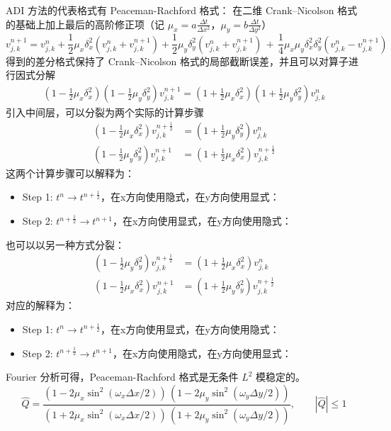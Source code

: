 ADI 方法的代表格式有 Peaceman-Rachford 格式：
在二维 Crank–Nicolson 格式的基础上加上最后的高阶修正项（记 $\mu_x =  a \frac{\Delta t}{\Delta x^2}$，$\mu_y =  b \frac{\Delta t}{\Delta y^2}$）
\[
    v_{j,k}^{n+1} = v_{j,k}^n
    + \frac12 \mu_x \delta_x^2(v_{j,k}^n + v_{j,k}^{n+1})
    + \frac12 \mu_y \delta_y^2(v_{j,k}^n + v_{j,k}^{n+1})
    \,+\, \frac14 \mu_x \mu_y \delta_x^2 \delta_y^2(v_{j,k}^n - v_{j,k}^{n+1})
\]
得到的差分格式保持了 Crank–Nicolson 格式的局部截断误差，并且可以对算子进行因式分解
\begin{align*}
    \left(1-\frac12 \mu_x \delta_x^2 \right) \left(1-\frac12 \mu_y \delta_y^2 \right) v_{j,k}^{n+1}
    =\left(1+\frac12 \mu_x \delta_x^2\right) \left(1+\frac12 \mu_y \delta_y^2\right) v_{j,k}^{n}
\end{align*}
引入中间层，可以分裂为两个实际的计算步骤
\begin{align*}
    \left(1-\frac12  \mu_x \delta_x^2 \right) v_{j,k}^{n+\frac12} & =\left(1+\frac12 \mu_y \delta_y^2\right) v_{j,k}^{n}         \\
    \left(1-\frac12  \mu_y \delta_y^2 \right) v_{j,k}^{n+1}       & =\left(1+\frac12 \mu_x \delta_x^2\right) v_{j,k}^{n+\frac12}
\end{align*}
这两个计算步骤可以解释为：
\begin{itemize}
    \item Step 1: $t^n \to t^{n+\frac12}$，在x方向使用隐式，在y方向使用显式：
    \item Step 2: $t^{n+\frac12} \to t^{n+1}$，在x方向使用显式，在y方向使用隐式：
\end{itemize}
也可以以另一种方式分裂：
\begin{align*}
    \left(1-\frac12 \mu_y \delta_y^2 \right) v_{j,k}^{n+\frac12} & =\left(1+\frac12 \mu_x \delta_x^2\right) v_{j,k}^{n}         \\
    \left(1-\frac12 \mu_x \delta_x^2 \right) v_{j,k}^{n+1}       & =\left(1+\frac12 \mu_y \delta_y^2\right) v_{j,k}^{n+\frac12}
\end{align*}
对应的解释为：
\begin{itemize}
    \item Step 1: $t^n \to t^{n+\frac12}$，在x方向使用显式，在y方向使用隐式：
    \item Step 2: $t^{n+\frac12} \to t^{n+1}$，在x方向使用隐式，在y方向使用显式：
\end{itemize}
Fourier 分析可得，Peaceman-Rachford 格式是无条件 $L^2$ 模稳定的。
\[
    \widehat{Q} =
    \frac{(1-2\mu_x \sin^2(\omega_x \Delta x/2))\,(1-2\mu_y \sin^2(\omega_y \Delta y/2))}{(1+2\mu_x \sin^2(\omega_x \Delta x/2))\,(1+2\mu_y \sin^2(\omega_y \Delta y/2))},\qquad
    |\widehat{Q}| \le 1
\]

